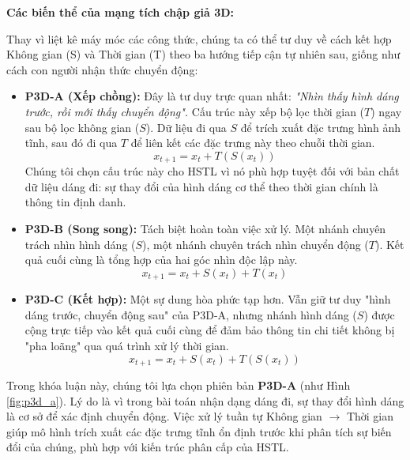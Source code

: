 \begin{enumerate}
        \textbf{Các biến thể của mạng tích chập giả 3D:}

        Thay vì liệt kê máy móc các công thức, chúng ta có thể tư duy về cách kết hợp Không gian (S) và Thời gian (T) theo ba hướng tiếp cận tự nhiên sau, giống như cách con người nhận thức chuyển động:

        \begin{itemize}
          \item \textbf{P3D-A (Xếp chồng):}
                Đây là tư duy trực quan nhất: \textit{"Nhìn thấy hình dáng trước, rồi mới thấy chuyển động".}
                Cấu trúc này xếp bộ lọc thời gian ($T$) ngay sau bộ lọc không gian ($S$). Dữ liệu đi qua $S$ để trích xuất đặc trưng hình ảnh tĩnh, sau đó đi qua $T$ để liên kết các đặc trưng này theo chuỗi thời gian.
                \begin{equation}
                  x_{t+1} = x_t + T\left(S(x_t)\right)
                \end{equation}
                Chúng tôi chọn cấu trúc này cho HSTL vì nó phù hợp tuyệt đối với bản chất dữ liệu dáng đi: sự thay đổi của hình dáng cơ thể theo thời gian chính là thông tin định danh.

          \item \textbf{P3D-B (Song song):}
                Tách biệt hoàn toàn việc xử lý. Một nhánh chuyên trách nhìn hình dáng ($S$), một nhánh chuyên trách nhìn chuyển động ($T$). Kết quả cuối cùng là tổng hợp của hai góc nhìn độc lập này.
                \begin{equation}
                  x_{t+1} = x_t + S(x_t) + T(x_t)
                \end{equation}

          \item \textbf{P3D-C (Kết hợp):}
                Một sự dung hòa phức tạp hơn. Vẫn giữ tư duy "hình dáng trước, chuyển động sau" của P3D-A, nhưng nhánh hình dáng ($S$) được cộng trực tiếp vào kết quả cuối cùng để đảm bảo thông tin chi tiết không bị "pha loãng" qua quá trình xử lý thời gian.
                \begin{equation}
                  x_{t+1} = x_t + S(x_t) + T\left(S(x_t)\right)
                \end{equation}
        \end{itemize}

        Trong khóa luận này, chúng tôi lựa chọn phiên bản \textbf{P3D-A} (như Hình \ref{fig:p3d_a}). Lý do là vì trong bài toán nhận dạng dáng đi, sự thay đổi hình dáng là cơ sở để xác định chuyển động. Việc xử lý tuần tự Không gian $\rightarrow$ Thời gian giúp mô hình trích xuất các đặc trưng tĩnh ổn định trước khi phân tích sự biến đổi của chúng, phù hợp với kiến trúc phân cấp của HSTL.


\end{enumerate}
